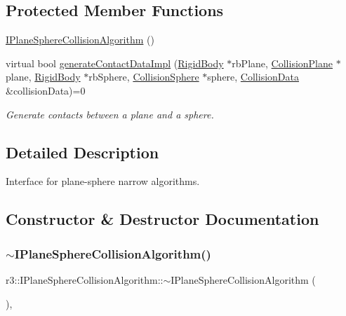 \subsection*{Protected Member Functions}
\begin{DoxyCompactItemize}
\item 
\mbox{\hyperlink{classr3_1_1_i_plane_sphere_collision_algorithm_a249833e88ee66651740f119d6fab0910}{I\+Plane\+Sphere\+Collision\+Algorithm}} ()
\item 
virtual bool \mbox{\hyperlink{classr3_1_1_i_plane_sphere_collision_algorithm_a92ddfd3ba00ed53b183a6aef41b04a60}{generate\+Contact\+Data\+Impl}} (\mbox{\hyperlink{classr3_1_1_rigid_body}{Rigid\+Body}} $\ast$rb\+Plane, \mbox{\hyperlink{classr3_1_1_collision_plane}{Collision\+Plane}} $\ast$plane, \mbox{\hyperlink{classr3_1_1_rigid_body}{Rigid\+Body}} $\ast$rb\+Sphere, \mbox{\hyperlink{classr3_1_1_collision_sphere}{Collision\+Sphere}} $\ast$sphere, \mbox{\hyperlink{classr3_1_1_collision_data}{Collision\+Data}} \&collision\+Data)=0
\begin{DoxyCompactList}\small\item\em Generate contacts between a plane and a sphere. \end{DoxyCompactList}\end{DoxyCompactItemize}


\subsection{Detailed Description}
Interface for plane-\/sphere narrow algorithms. 

\subsection{Constructor \& Destructor Documentation}
\mbox{\label{classr3_1_1_i_plane_sphere_collision_algorithm_a25bd94a472e466de011c128012b8e938}} 
\subsubsection{\texorpdfstring{$\sim$\+I\+Plane\+Sphere\+Collision\+Algorithm()}{~IPlaneSphereCollisionAlgorithm()}}
{\footnotesize\ttfamily r3\+::\+I\+Plane\+Sphere\+Collision\+Algorithm\+::$\sim$\+I\+Plane\+Sphere\+Collision\+Algorithm (\begin{DoxyParamCaption}{ }\end{DoxyParamCaption})\hspace{0.3cm}{\ttfamily [virtual]}, {\ttfamily [default]}}

